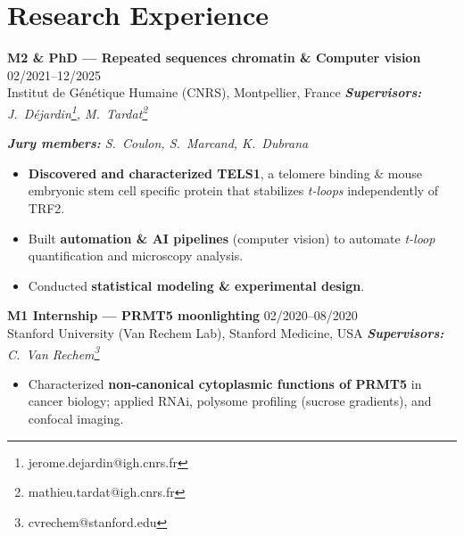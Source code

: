 \documentclass[11pt,a4paper]{article}
\begin{document}
\section*{Research Experience}
\textbf{M2 \& PhD --- Repeated sequences chromatin \& Computer vision} \hfill 02/2021--12/2025\hspace{0.3em}\\
Institut de Génétique Humaine (CNRS), Montpellier, France \hfill \textit{\textbf{Supervisors:} J.\ Déjardin\footnote{jerome.dejardin@igh.cnrs.fr}, M.\ Tardat\footnote{mathieu.tardat@igh.cnrs.fr}}
\begin{center}\emph{\textbf{Jury members:} S.\ Coulon, S.\ Marcand, K.\ Dubrana}\end{center}
\begin{itemize}
  \item \textbf{Discovered and characterized TELS1}, a telomere binding \& mouse embryonic stem cell specific protein that stabilizes \textit{t-loops} independently of TRF2.
  \item Built \textbf{automation \& AI pipelines} (computer vision) to automate \textit{t-loop} quantification and microscopy analysis.
  \item Conducted \textbf{statistical modeling \& experimental design}.
\end{itemize}

\textbf{M1 Internship --- PRMT5 moonlighting} \hfill 02/2020--08/2020\hspace{0.3em}\\
Stanford University (Van Rechem Lab), Stanford Medicine, USA \hfill \textit{\textbf{Supervisors:} C.\ Van Rechem\footnote{cvrechem@stanford.edu}}
\begin{itemize}
  \item Characterized \textbf{non-canonical cytoplasmic functions of PRMT5} in cancer biology; applied RNAi, polysome profiling (sucrose gradients), and confocal imaging.
\end{itemize}
\end{document}
